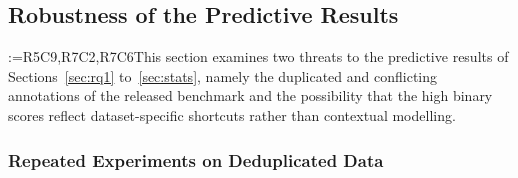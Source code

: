 \documentclass[a4paper,fleqn]{cas-sc}
\makeatletter
\newif\iftracked
\newcommand{\rv@setcolour}[1]{%
  \IfStrEq{#1}{R7C7}{\color{rvEdit}}{%
    \IfSubStr{#1}{R5}{\IfSubStr{#1}{R7}{\color{rvBoth}}{\color{rvFive}}}{\color{rvSeven}}}}
\newcommand{\rv@tag}[1]{\textsuperscript{\sffamily\bfseries\scriptsize[\StrSubstitute{#1}{,}{, }]}\,}
\newcommand{\rv@recordone}[1]{%
  \edef\rv@i{#1}%
  \ifcsdef{rv@n@\rv@i}{}{\csgdef{rv@n@\rv@i}{0}}%
  \csxdef{rv@n@\rv@i}{\the\numexpr\csuse{rv@n@\rv@i}+1\relax}%
  \begingroup\edef\@currentlabel{\rv@i}\label{rv:\rv@i:\csuse{rv@n@\rv@i}}\endgroup}
\newcommand{\rv@record}[1]{\@for\rv@id:=#1\do{\expandafter\rv@recordone\expandafter{\rv@id}}}
\DeclareRobustCommand{\rc}[2]{\rv@record{#1}\iftracked{\rv@setcolour{#1}\rv@tag{#1}#2}\else#2\fi}
\DeclareRobustCommand{\rcx}[2]{\iftracked{\rv@setcolour{#1}\rv@tag{#1}#2}\else#2\fi}
\makeatother
\begin{document}
\subsection{\texorpdfstring{\rcx{R5C9,R7C2,R7C6}{Robustness of the Predictive Results}}{Robustness of the Predictive Results}}
\label{sec:robust}
\rc{R5C9,R7C2,R7C6}{This section examines two threats to the predictive results of Sections~\ref{sec:rq1} to~\ref{sec:stats}, namely the duplicated and conflicting annotations of the released benchmark and the possibility that the high binary scores reflect dataset-specific shortcuts rather than contextual modelling.}

\subsubsection{\texorpdfstring{\rcx{R5C9,R7C2}{Repeated Experiments on Deduplicated Data}}{Repeated Experiments on Deduplicated Data}}
\label{sec:robust-dedup}
\end{document}
